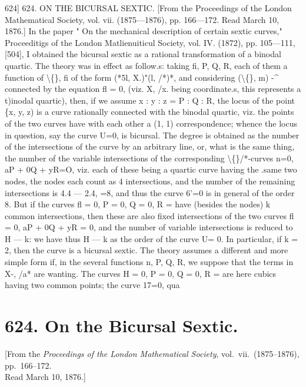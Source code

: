 \documentclass[11pt,a4paper]{book}
\begin{document}
624]
624.
ON THE
BICURSAL
SEXTIC.
[From
the Proceedings of the London Mathematical
Society,
vol.
vii.
(1875---1876),
pp. 166---172.
Read March
10,
1876.]
In the paper " On
the mechanical description of certain sextic
curves," Proceeditigs of
the London Matlienuiticul Society, vol.
IV. (1872), pp. 105---111, [504], I obtained the
bicursal
sextic
as
a
rational
transformation
of a
binodal
quartic.
The
theory was
in
effect
as
follow.s:
taking
fi, P,
Q, R, each
of them a function of \textbackslash\{\},
fi of the form (*5l, X.)"(l, /*)*,
and
considering
(\textbackslash\{\}, m)
-\textasciicircum{}
connected by the equation
fl = 0,
(viz.
X,
/x. being
coordinate.s,
this
represents
a
t)inodal
quartic),
then,
if we
assume x
: y
: z = P
: Q
: R,
the
locus
of
the
point
\{x,
y,
z)
is
a
curve
rationally
connected
with
the
binodal
quartic,
viz.
the
points
of
the
two
curves
have
with
each
other
a
(1,
1)
correspondence;
whence
the
locus
in
question,
say
the
curve
U=0,
is
bicursal.
The degree
is obtained as the
number
of
the
intersections
of
the
curve
by
an
arbitrary
line,
or,
what
is
the
same
thing, the number of the
variable
intersections of the corresponding \textbackslash\{\}/*-curves
n=0,
aP + 0Q + yR=O,
viz.
each
of these
being
a
quartic
curve
having
the
.same
two
nodes,
the
nodes each
count as 4 intersections, and the number of the remaining intersections
is 4.4 --- 2.4, =8,
and
thus
the
curve
6'=0
is
in
general
of
the
order
8.
But
if
the
curves
fl = 0,
P = 0, Q = 0, R =
have
(besides
the
nodes)
k common
intersections,
then
these
are
also
fixed
intersections
of
the
two
curves
fl = 0, aP + 0Q + yR = 0, and the
number of
variable
intersections
is
reduced
to
H --- k:
we
have
thus
H --- k
as
the
order
of
the
curve U= 0.
In
particular,
if k = 2, then the curve
is a
bicursal
sextic.
The
theory assumes
a
different
and
more
simple
form
if,
in
the
several
functions
n,
P,
Q,
R, we
suppose
that
the
terms
in
X-,
/a*
are
wanting.
The
curves H = 0,
P = 0, Q = 0, R =
are
here
cubics
having
two common
points;
the
curve
17=0, qua


\newpage
\section*{624. On the Bicursal Sextic.}

\begin{center}
\small[From the \textit{Proceedings of the London Mathematical Society}, vol.~vii.\ (1875--1876), pp.~166--172.\\Read March 10, 1876.]
\end{center}
\end{document}
